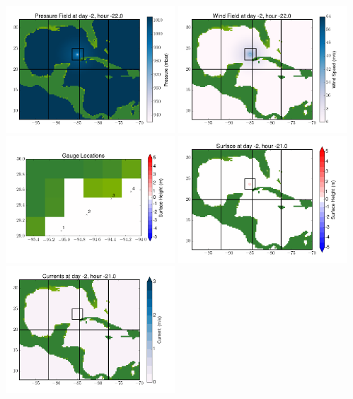 \documentclass[11pt]{article}
\begin{document}
\includegraphics[width=0.475\textwidth]{frame0002fig8.png}
\vskip 10pt 
\includegraphics[width=0.475\textwidth]{frame0002fig9.png}
\includegraphics[width=0.475\textwidth]{frame0002fig10.png}
\vskip 10pt 
\includegraphics[width=0.475\textwidth]{frame0003fig1.png}
\includegraphics[width=0.475\textwidth]{frame0003fig2.png}
\end{document}
